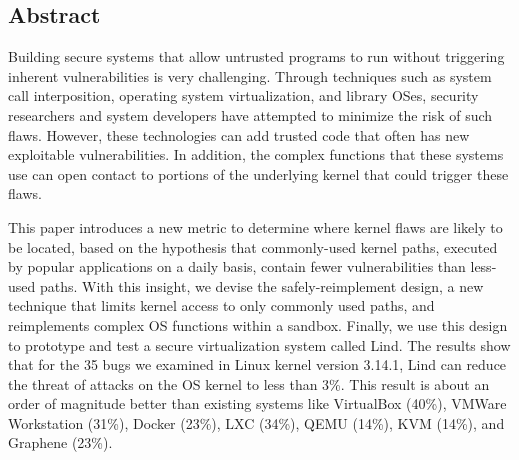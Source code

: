 \subsection*{Abstract}
Building secure systems that allow untrusted programs to run without
triggering inherent vulnerabilities %
is very challenging.
Through techniques such as system call interposition,
operating system virtualization, and library OSes, security researchers
and system developers have attempted to minimize the risk of such flaws.
However, these technologies can add trusted code that often has new
exploitable vulnerabilities. 
In addition, the complex functions that these systems use can open contact 
to portions of the underlying kernel that could trigger these flaws.

This paper introduces a new metric to determine where kernel flaws are
likely to be located, based on the  hypothesis that commonly-used kernel
paths, executed by popular applications on a daily basis, contain fewer
vulnerabilities than less-used paths. With this insight, we devise the
safely-reimplement design, a new technique that limits kernel access to only
commonly used paths, and reimplements complex OS functions within a sandbox. 
Finally, we use this design to prototype and test a secure virtualization system called Lind.
The results show that for the 35 bugs we examined in Linux kernel version 3.14.1, 
Lind can reduce the threat of attacks on the OS kernel to less than 3\%.
This result is about an order of magnitude better than existing systems like VirtualBox (40\%),
VMWare Workstation (31\%), Docker (23\%), LXC (34\%), QEMU (14\%), KVM (14\%), and Graphene (23\%).



